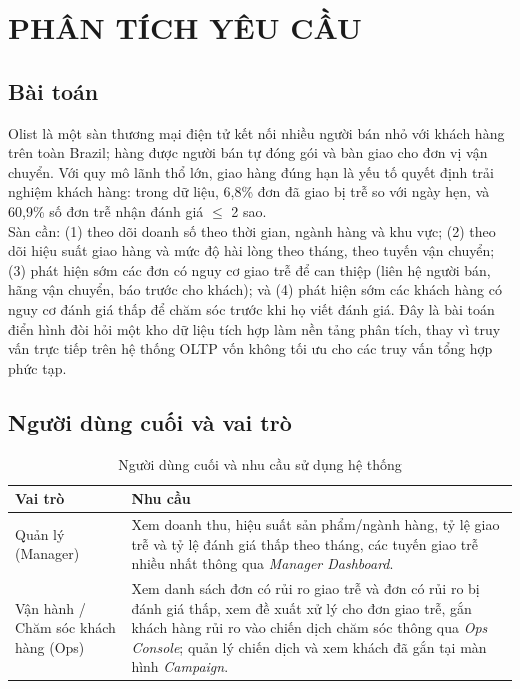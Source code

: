 \section{PHÂN TÍCH YÊU CẦU}

\subsection{Bài toán}
\hspace{1cm}
Olist là một sàn thương mại điện tử kết nối nhiều người bán nhỏ với khách hàng trên toàn
Brazil; hàng được người bán tự đóng gói và bàn giao cho đơn vị vận chuyển. Với quy mô lãnh
thổ lớn, giao hàng đúng hạn là yếu tố quyết định trải nghiệm khách hàng: trong dữ liệu,
6,8\% đơn đã giao bị trễ so với ngày hẹn, và 60,9\% số đơn trễ nhận đánh giá $\leq$ 2 sao.\\
Sàn cần: (1) theo dõi doanh số theo thời gian, ngành hàng và khu vực; (2) theo dõi hiệu suất
giao hàng và mức độ hài lòng theo tháng, theo tuyến vận chuyển; (3) phát hiện sớm các đơn có
nguy cơ giao trễ để can thiệp (liên hệ người bán, hãng vận chuyển, báo trước cho khách); và
(4) phát hiện sớm các khách hàng có nguy cơ đánh giá thấp để chăm sóc trước khi họ viết đánh
giá. Đây là bài toán điển hình đòi hỏi một kho dữ liệu tích hợp làm nền tảng phân tích, thay
vì truy vấn trực tiếp trên hệ thống OLTP vốn không tối ưu cho các truy vấn tổng hợp phức tạp.

\subsection{Người dùng cuối và vai trò}
\begin{table}[H]
\centering
\caption{Người dùng cuối và nhu cầu sử dụng hệ thống}
\begin{tabular}{@{}p{5cm}p{12cm}@{}}
\toprule
\textbf{Vai trò} & \textbf{Nhu cầu} \\
\midrule
Quản lý (Manager) & Xem doanh thu, hiệu suất sản phẩm/ngành hàng, tỷ lệ giao trễ và tỷ lệ
đánh giá thấp theo tháng, các tuyến giao trễ nhiều nhất thông qua \textit{Manager Dashboard}. \\
Vận hành / Chăm sóc khách hàng (Ops) & Xem danh sách đơn có rủi ro giao trễ và đơn có rủi ro
bị đánh giá thấp, xem đề xuất xử lý cho đơn giao trễ, gắn khách hàng rủi ro vào chiến dịch chăm sóc thông qua
\textit{Ops Console}; quản lý chiến dịch và xem khách đã gắn tại màn hình \textit{Campaign}. \\
\bottomrule
\end{tabular}
\end{table}

